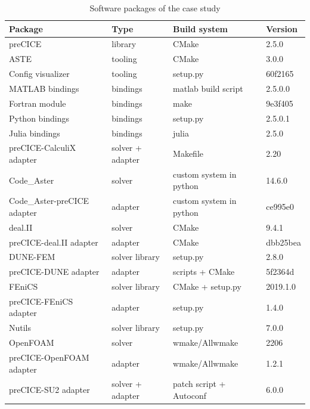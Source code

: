 \documentclass{eceasst}
\begin{document}
\begin{table}[!t]
  \normalsize
  \caption{Software packages of the case study}
  \label{table:label-distribution}
  \centering
  \begin{tabular}{|l|l|l|l|}
    \hline
    \bfseries Package & \bfseries Type & \bfseries Build system & \bfseries Version \\ \hline
    preCICE & library & CMake & 2.5.0 \\ \hline
    ASTE & tooling & CMake & 3.0.0 \\ \hline
    Config visualizer & tooling & setup.py & 60f2165 \\ \hline
    MATLAB bindings & bindings & matlab build script & 2.5.0.0 \\ \hline
    Fortran module & bindings & make & 9e3f405 \\ \hline
    Python bindings & bindings & setup.py & 2.5.0.1 \\ \hline
    Julia bindings & bindings & julia & 2.5.0 \\ \hline
    preCICE-CalculiX adapter & solver + adapter & Makefile & 2.20 \\ \hline
    Code\_Aster & solver & custom system in python & 14.6.0 \\ \hline
    Code\_Aster-preCICE adapter & adapter & custom system in python & ce995e0 \\ \hline
    deal.II & solver & CMake & 9.4.1 \\ \hline
    preCICE-deal.II adapter & adapter & CMake & dbb25bea \\ \hline
    DUNE-FEM & solver library & setup.py & 2.8.0 \\ \hline
    preCICE-DUNE adapter& adapter & scripts + CMake & 5f2364d \\ \hline
    FEniCS & solver library& CMake + setup.py & 2019.1.0 \\ \hline
    preCICE-FEniCS adapter & adapter & setup.py & 1.4.0 \\ \hline
    Nutils & solver library & setup.py & 7.0.0 \\ \hline
    OpenFOAM & solver & wmake/Allwmake & 2206 \\ \hline
    preCICE-OpenFOAM adapter & adapter & wmake/Allwmake & 1.2.1 \\ \hline
    preCICE-SU2 adapter & solver + adapter & patch script + Autoconf & 6.0.0 \\ \hline
  \end{tabular}
\end{table}
\end{document}
